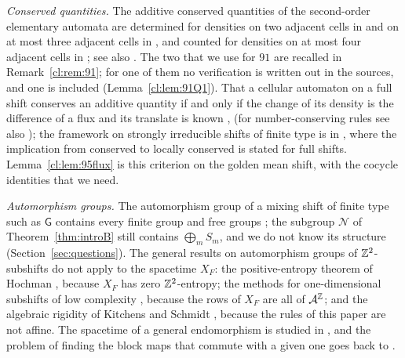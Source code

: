 \emph{Conserved quantities.} The additive conserved quantities of the second-order elementary automata are determined for densities on two adjacent cells in \cite[Table~II]{Takesue1989} and on at most three adjacent cells in \cite[Tables~3--5]{HT1991}, and counted for densities on at most four adjacent cells in \cite[Table~1]{Takesue1997}; see also \cite{Takesue1995}. The two that we use for $91$ are recalled in Remark~\ref{cl:rem:91}; for one of them no verification is written out in the sources, and one is included (Lemma~\ref{cl:lem:91Q1}). That a cellular automaton on a full shift conserves an additive quantity if and only if the change of its density is the difference of a flux and its translate is known \cite[Theorems~2.1, 2.2, 2.6 and~2.7]{HT1991}, \cite{Pivato2002,MBG2004} (for number-conserving rules see also \cite{BF1998}); the framework on strongly irreducible shifts of finite type is in \cite[Section~4.1]{KT2015}, where the implication from conserved to locally conserved is stated for full shifts. Lemma~\ref{cl:lem:95flux} is this criterion on the golden mean shift, with the cocycle identities that we need.

\emph{Automorphism groups.} The automorphism group of a mixing shift of finite type such as $\mathsf G$ contains every finite group and free groups \cite{BLR1988}; the subgroup $\mathcal N$ of Theorem~\ref{thm:introB} still contains $\bigoplus_mS_m$, and we do not know its structure (Section~\ref{sec:questions}). The general results on automorphism groups of $\mathbb{Z}^2$-subshifts do not apply to the spacetime $X_F$: the positive-entropy theorem of Hochman \cite{Hochman2010}, because $X_F$ has zero $\mathbb{Z}^2$-entropy; the methods for one-dimensional subshifts of low complexity \cite{CK2015,DDMP2016}, because the rows of $X_F$ are all of $\mathcal{A}^{\mathbb{Z}}$; and the algebraic rigidity of Kitchens and Schmidt \cite{KS2000}, because the rules of this paper are not affine. The spacetime of a general endomorphism is studied in \cite{CFK2019}, and the problem of finding the block maps that commute with a given one goes back to \cite{CHR1979}.

